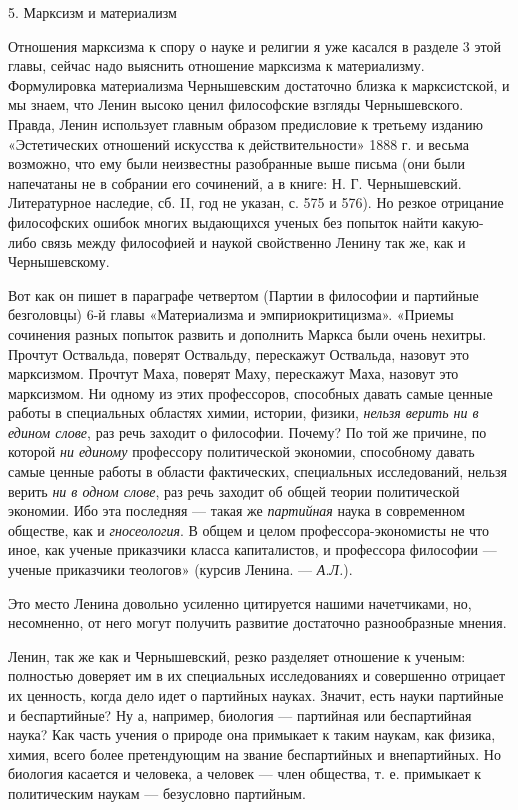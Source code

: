 5. Марксизм и материализм

Отношения  марксизма  к спору  о  науке  и  религии  я уже  касался  в
разделе  3 этой  главы,  сейчас надо  выяснить  отношение марксизма  к
материализму. Формулировка материализма Чернышевским достаточно близка
к марксистской, и мы знаем, что Ленин высоко ценил философские взгляды
Чернышевского. Правда, Ленин использует  главным образом предисловие к
третьему изданию «Эстетических отношений искусства к действительности»
1888 г.  и весьма возможно,  что ему были неизвестны  разобранные выше
письма (они были напечатаны не в собрании его сочинений, а в книге: Н.
Г. Чернышевский. Литературное наследие, сб.  II, год не указан, с. 575
и  576).  Но резкое  отрицание  философских  ошибок многих  выдающихся
ученых без  попыток найти какую-либо  связь между философией  и наукой
свойственно Ленину так же, как и Чернышевскому.

Вот как он пишет в параграфе четвертом (Партии в философии и партийные
безголовцы)  6-й  главы  «Материализма и  эмпириокритицизма».  «Приемы
сочинения  разных  попыток  развить  и  дополнить  Маркса  были  очень
нехитры. Прочтут  Оствальда, поверят Оствальду,  перескажут Оствальда,
назовут это  марксизмом. Прочтут Маха, поверят  Маху, перескажут Маха,
назовут  это  марксизмом. Ни  одному  из  этих профессоров,  способных
давать  самые ценные  работы  в специальных  областях химии,  истории,
физики, \emph{нельзя  верить ни  в едином слове},  раз речь  заходит о
философии. Почему?  По той  же причине,  по которой  \emph{ни единому}
профессору  политической  экономии,  способному  давать  самые  ценные
работы в области фактических,  специальных исследований, нельзя верить
\emph{ни в одном слове}, раз речь заходит об общей теории политической
экономии.  Ибо эта  последняя ---  такая же  \emph{партийная} наука  в
современном  обществе,  как  и  \emph{гносеология}. В  общем  и  целом
профессора-экономисты  не  что  иное,  как  ученые  приказчики  класса
капиталистов, и  профессора философии --- ученые  приказчики теологов»
(курсив Ленина. --- \emph{А.Л.}).

Это место Ленина довольно  усиленно цитируется нашими начетчиками, но,
несомненно, от  него могут получить развитие  достаточно разнообразные
мнения.

Ленин, так же как и  Чернышевский, резко разделяет отношение к ученым:
полностью  доверяет им  в  их специальных  исследованиях и  совершенно
отрицает их ценность, когда дело идет о партийных науках. Значит, есть
науки партийные и беспартийные? Ну а, например, биология --- партийная
или беспартийная  наука? Как  часть учения о  природе она  примыкает к
таким наукам,  как физика, химия,  всего более претендующим  на звание
беспартийных  и  внепартийных.  Но  биология касается  и  человека,  а
человек --- член  общества, т. е. примыкает к  политическим наукам ---
безусловно партийным.

